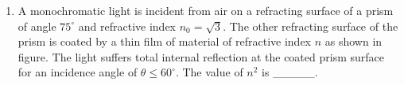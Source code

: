 
\begin{enumerate}
    \item A monochromatic light is incident from air on a refracting surface of a prism of angle \(75^\circ\) and refractive index \(n_0 = \sqrt{3}\). The other refracting surface of the prism is coated by a thin film of material of refractive index \(n\) as shown in figure. The light suffers total internal reflection at the coated prism surface for an incidence angle of \(\theta \leq 60^\circ\). The value of \(n^2\) is \_\_\_\_\_.
    \begin{center}
    \end{center}
\end{enumerate}
